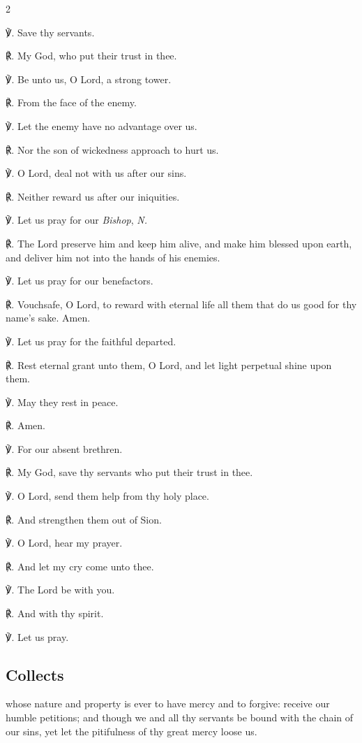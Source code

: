 \begin{multicols}{2}
\sloppy

℣. Save thy servants.\par
℟. My God, who put their trust in thee.\par
℣. Be unto us, O Lord, a strong tower.\par
℟. From the face of the enemy.\par
℣. Let the enemy have no advantage over us.\par
℟. Nor the son of wickedness approach to hurt us.\par
℣. O Lord, deal not with us after our sins.\par
℟. Neither reward us after our iniquities.\par
℣. Let us pray for our \textit{Bishop}, \textit{N.}\par
℟. The Lord preserve him and keep him alive, and make him blessed upon earth, and deliver him not into the hands of his enemies.\par
℣. Let us pray for our benefactors.\par
℟. Vouchsafe, O Lord, to reward with eternal life all them that do us good for thy name's sake. Amen.\par
℣. Let us pray for the faithful departed.\par
℟. Rest eternal grant unto them, O Lord, and let light perpetual shine upon them.\par
℣. May they rest in peace.\par
℟. Amen.\par
℣. For our absent brethren.\par
℟. My God, save thy servants who put their trust in thee.\par
℣. O Lord, send them help from thy holy place.\par
℟. And strengthen them out of Sion.\par
℣. O Lord, hear my prayer.\par
℟. And let my cry come unto thee.\par
℣. The Lord be with you.\par
℟. And with thy spirit.\par
℣. Let us pray.

\fussy
\end{multicols}

\subsection{Collects}
 whose nature and property is ever to have mercy and to forgive: receive our humble petitions; and though we and all thy servants be bound with the chain of our sins, yet let the pitifulness of thy great mercy loose us.

